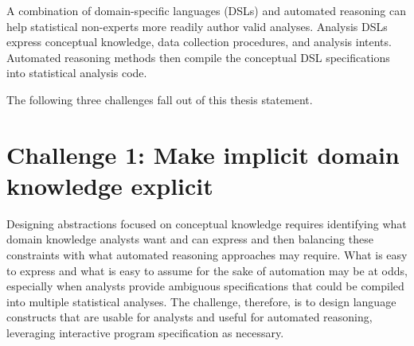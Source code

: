 

A combination of domain-specific languages (DSLs) and automated reasoning can
help statistical non-experts more readily author valid analyses. Analysis DSLs
express conceptual knowledge, data collection procedures, and
analysis intents. Automated reasoning methods then compile the conceptual
DSL specifications into statistical analysis code.


The following three challenges fall out of this thesis statement.

\section*{Challenge 1: Make implicit domain knowledge explicit} %
Designing abstractions focused on conceptual knowledge requires identifying what
domain knowledge analysts want and can express and then balancing these
constraints with what automated reasoning approaches may require. What is easy
to express and what is easy to assume for the sake of automation may be at odds,
especially when analysts provide ambiguous specifications that could be compiled
into multiple statistical analyses. The challenge, therefore, is to design
language constructs that are usable for analysts and useful for automated
reasoning, leveraging interactive program specification as necessary.


